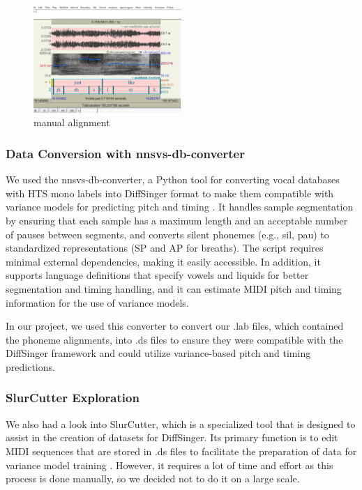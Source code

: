 \documentclass[a4paper]{article}
\begin{document}
\begin{figure}[htbp]
    \centering
    \includegraphics[width=0.5\textwidth]{graphics/manual_alignment.png}
    \caption{manual alignment}
    \label{fig:bild3}
\end{figure}

\subsubsection{Data Conversion with nnsvs-db-converter}
We used the nnsvs-db-converter, a Python tool for converting vocal databases with HTS mono labels into DiffSinger format to make them compatible with variance models for predicting pitch and timing \cite{nnsvsdbconverter}. It handles sample segmentation by ensuring that each sample has a maximum length and an acceptable number of pauses between segments, and converts silent phonemes (e.g., sil, pau) to standardized representations (SP and AP for breaths). The script requires minimal external dependencies, making it easily accessible. In addition, it supports language definitions that specify vowels and liquids for better segmentation and timing handling, and it can estimate MIDI pitch and timing information for the use of variance models.

In our project, we used this converter to convert our .lab files, which contained the phoneme alignments, into .ds files to ensure they were compatible with the DiffSinger framework and could utilize variance-based pitch and timing predictions.

\subsubsection{SlurCutter Exploration}
We also had a look into SlurCutter, which is a specialized tool that is designed to assist in the creation of datasets for DiffSinger. Its primary function is to edit MIDI sequences that are stored in .ds files to facilitate the preparation of data for variance model training \cite{openvpi}. However, it requires a lot of time and effort as this process is done manually, so we decided not to do it on a large scale.
\end{document}
